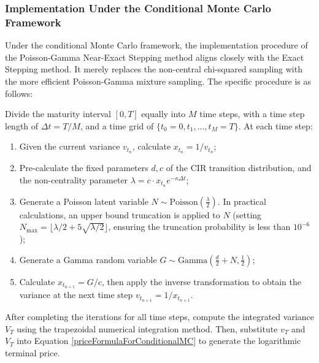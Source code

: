 \subsubsection{Implementation Under the Conditional Monte Carlo Framework}
Under the conditional Monte Carlo framework, the implementation procedure of the Poisson-Gamma Near-Exact Stepping method aligns closely with the Exact Stepping method. It merely replaces the non-central chi-squared sampling with the more efficient Poisson-Gamma mixture sampling. The specific procedure is as follows:

Divide the maturity interval $[0,T]$ equally into $M$ time steps, with a time step length of $\Delta t = T/M$, and a time grid of $\{t_0=0,t_1,\ldots,t_M=T\}$. At each time step:
\begin{enumerate}
  \item Given the current variance $v_{t_n}$, calculate $x_{t_n} = 1/v_{t_n}$;
  \item Pre-calculate the fixed parameters $d,c$ of the CIR transition distribution, and the non-centrality parameter $\lambda=c\cdot x_{t_n} e^{-\kappa \Delta t}$;
  \item Generate a Poisson latent variable $N\sim \text{Poisson}\left(\frac{\lambda}{2}\right)$. In practical calculations, an upper bound truncation is applied to $N$ (setting $N_{\max} = \lfloor \lambda/2 + 5\sqrt{\lambda/2} \rfloor$, ensuring the truncation probability is less than $10^{-6}$);
  \item Generate a Gamma random variable $G\sim \text{Gamma}\left(\frac{d}{2} + N, \frac{1}{2}\right)$;
  \item Calculate $x_{t_{n+1}} = G/c$, then apply the inverse transformation to obtain the variance at the next time step $v_{t_{n+1}} = 1/x_{t_{n+1}}$.
\end{enumerate}
After completing the iterations for all time steps, compute the integrated variance $V_T$ using the trapezoidal numerical integration method. Then, substitute $v_T$ and $V_T$ into Equation \eqref{priceFormulaForConditionalMC} to generate the logarithmic terminal price.

